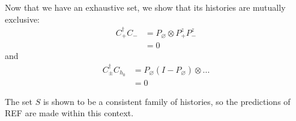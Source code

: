 Now that we have an exhaustive set, we show that its histories are mutually exclusive:
\begin{align}
  C_+^\dagger C_- &= P_\varnothing \otimes P^z_+ P^z_-  \\ \nonumber
  &= 0
\end{align}
and
\begin{align}
  C_\pm^\dagger C_{h_0} &= P_\varnothing (I-P_\varnothing) \otimes ... \\ \nonumber
  &= 0
\end{align}

The set $S$ is shown to be a consistent family of histories, so the predictions of REF are made within this context.
%
%
%

